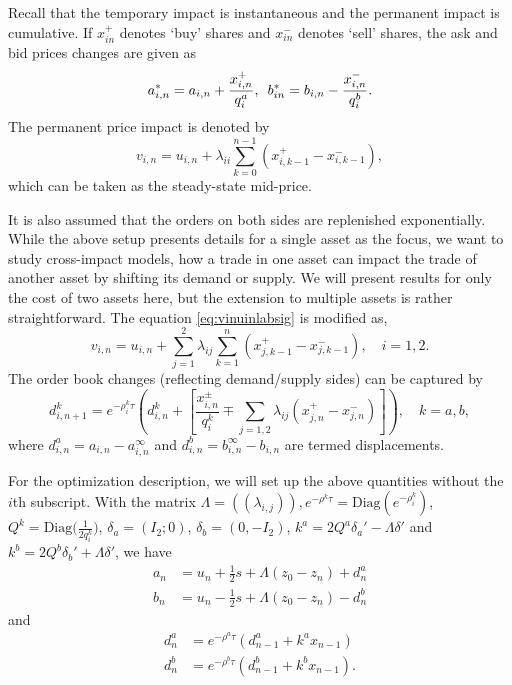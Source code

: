 Recall that the temporary impact is instantaneous and the permanent impact is cumulative. If $x_{in}^+$ denotes `buy' shares and $x_{in}^-$ denotes `sell' shares, the ask and bid prices changes are given as
	\begin{equation}
	a_{i,n}^*= a_{i,n} + \dfrac{x_{i,n}^+}{q_i^a}, \enskip b_{in}^*= b_{i,n} - \dfrac{x_{i,n}^-}{q_i^b}.
	\end{equation}
The permanent price impact is denoted by
	\begin{equation} \label{eq:vinuinlabsig}
	v_{i,n}= u_{i,n} + \lambda_{ii} \sum_{k=0}^{n-1} (x_{i,k-1}^+ - x_{i,k-1}^-),
	\end{equation}
which can be taken as the steady-state mid-price. 


It is also assumed that the orders on both sides are replenished exponentially. While the above setup presents details for a single asset as the focus, we want to study cross-impact models, how a trade in one asset can impact the trade of another asset by shifting its demand or supply. We will present results for only the cost of two assets here, but the extension to multiple assets is rather straightforward. The equation \eqref{eq:vinuinlabsig} is modified as,
	\begin{equation}
	v_{i,n}= u_{i,n} + \sum_{j=1}^2 \lambda_{ij} \sum_{k=1}^n (x_{j,k-1}^+ - x_{j,k-1}^-), \quad i=1,2.
	\end{equation}
The order book changes (reflecting demand/supply sides) can be captured by
	\begin{equation}
	d_{i,n+1}^k = e^{-\rho_i^k \tau} \left( d_{i,n}^k + \left[ \dfrac{x_{i,n}^\pm}{q_i^k} \mp \sum_{j=1,2} \lambda_{ij} (x_{j,n}^+ - x_{j,n}^-) \right] \right), \quad k=a,b,
	\end{equation}
where $d_{i,n}^a= a_{i,n} - a_{i,n}^\infty$ and $d_{i,n}^b= b_{i,n}^\infty - b_{i,n}$ are termed displacements. 


For the optimization description, we will set up the above quantities without the $i$th subscript. With the matrix $\Lambda= ((\lambda_{i,j})), e^{-\rho^k \tau}= \text{Diag}(e^{-\rho_i^k})$, $Q^k= \text{Diag}\big( \frac{1}{2q_i^k} \big)$, $\delta_a= (I_2;0)$, $\delta_b= (0, -I_2)$, $k^a= 2Q^a \delta_a' - \Lambda \delta'$ and $k^b= 2Q^b \delta_b' + \Lambda \delta'$, we have
	\begin{equation}
	\begin{aligned}
	a_n&= u_n + \frac{1}{2}s + \Lambda(z_0 - z_n) + d_n^a \\
	b_n&= u_n - \frac{1}{2}s + \Lambda(z_0 - z_n) - d_n^b 
	\end{aligned}
	\end{equation}
and
	\begin{equation}
	\begin{aligned}
	d_n^a&= e^{-\rho^a \tau} (d_{n-1}^a + k^a x_{n-1}) \\
	d_n^b&= e^{-\rho^b \tau} (d_{n-1}^b + k^b x_{n-1}).
	\end{aligned}
	\end{equation}


